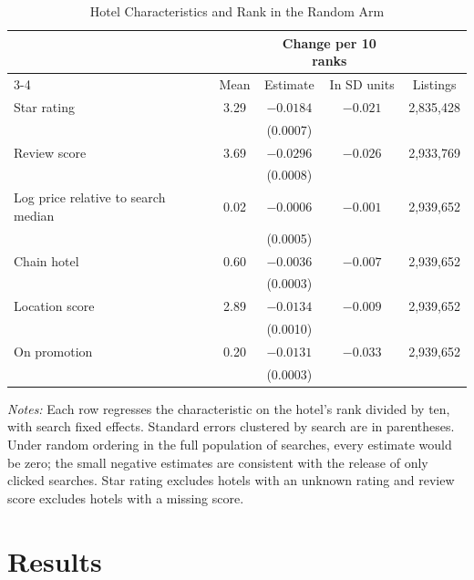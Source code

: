 \documentclass[12pt]{article}
\begin{document}
\begin{table}[htbp]
\centering
\begin{threeparttable}
\caption{Hotel Characteristics and Rank in the Random Arm}
\label{tab:randcheck}
\begin{tabular}{lcccc}
\toprule
 & & \multicolumn{2}{c}{Change per 10 ranks} & \\
\cmidrule(lr){3-4}
 & Mean & Estimate & In SD units & Listings \\
\midrule
Star rating & 3.29 & $-0.0184$ & $-0.021$ & 2,835,428 \\
 & & (0.0007) & & \\
Review score & 3.69 & $-0.0296$ & $-0.026$ & 2,933,769 \\
 & & (0.0008) & & \\
Log price relative to search median & 0.02 & $-0.0006$ & $-0.001$ & 2,939,652 \\
 & & (0.0005) & & \\
Chain hotel & 0.60 & $-0.0036$ & $-0.007$ & 2,939,652 \\
 & & (0.0003) & & \\
Location score & 2.89 & $-0.0134$ & $-0.009$ & 2,939,652 \\
 & & (0.0010) & & \\
On promotion & 0.20 & $-0.0131$ & $-0.033$ & 2,939,652 \\
 & & (0.0003) & & \\
\bottomrule
\end{tabular}
\begin{tablenotes}\footnotesize
\item \textit{Notes:} Each row regresses the characteristic on the hotel's rank divided by ten, with search fixed effects. Standard errors clustered by search are in parentheses. Under random ordering in the full population of searches, every estimate would be zero; the small negative estimates are consistent with the release of only clicked searches. Star rating excludes hotels with an unknown rating and review score excludes hotels with a missing score.
\end{tablenotes}
\end{threeparttable}
\end{table}

\section{Results}
\end{document}
